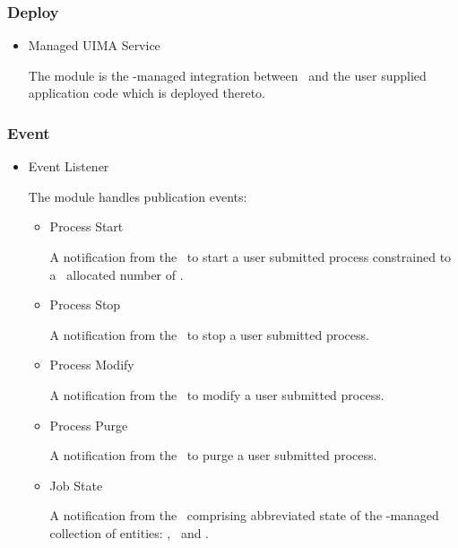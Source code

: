     \subsubsection{Deploy}
    
    \begin{itemize}
      \item Managed UIMA Service
      
      The module is the \varAgent-managed integration between
      \varUIMAAS~and the user supplied application code which is
      deployed thereto.
      
    \end{itemize}    
    
    \subsubsection{Event}  
    
    \begin{itemize}
      \item Event Listener
      
      The module handles publication events:
      \begin{itemize}
      \item Process Start 
      
      A notification from the \varProcessManager~to start a user submitted 
      process constrained to a \varResourceManager~allocated number of \varShares.
      
      \item Process Stop
      
      A notification from the \varProcessManager~to stop a user submitted 
      process.
      
      \item Process Modify
            
      A notification from the \varProcessManager~to modify a user submitted 
      process.
      
      \item Process Purge
                  
      A notification from the \varProcessManager~to purge a user submitted 
      process.
      
      \item Job State
                        
      A notification from the \varProcessManager~comprising abbreviated
      state of the \varDUCC-managed collection of entities: 
      \varJobs, \varReservations~and \varServices.
      
      \end{itemize}  

    \end{itemize}     
                 
